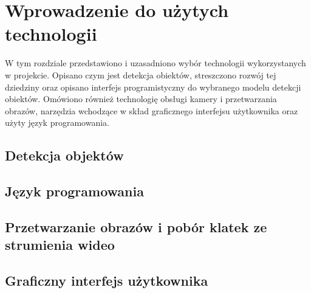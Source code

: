 \chapter{Wprowadzenie do użytych technologii}
\label{chap:technologie}
W tym rozdziale przedstawiono i uzasadniono wybór technologii wykorzystanych w projekcie. Opisano czym jest detekcja obiektów, streszczono rozwój tej dziedziny oraz opisano interfejs programistyczny do wybranego modelu detekcji obiektów. 
Omówiono również technologię obsługi kamery i przetwarzania obrazów, narzędzia wchodzące w skład graficznego interfejsu użytkownika oraz użyty język programowania.  

\section{Detekcja objektów}


\section{Język programowania}


\section{Przetwarzanie obrazów i pobór klatek ze strumienia wideo}


\section{Graficzny interfejs użytkownika}

